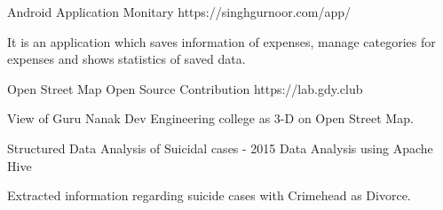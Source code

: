 \begin{cventries}

\cventry
{Android Application}%
{Monitary} 
{https://singhgurnoor.com/app/ } %
{ } %
{ \begin{cvitems}
\item {It is an application which saves information of expenses, manage categories for expenses and shows statistics of saved data.}\end{cvitems}
}

\cventry
{Open Street Map} %
{Open Source Contribution} %
{https://lab.gdy.club} %
{ } %
{ \begin{cvitems}
\item {View of Guru Nanak Dev Engineering college as $3$-D on Open Street Map.}\end{cvitems}
}
 
\cventry
{Structured Data Analysis of Suicidal cases - 2015} %
{Data Analysis using Apache Hive } %
{ } %
{ } %
{\begin{cvitems}
\item {Extracted information regarding suicide cases with Crimehead as
Divorce.}\end{cvitems}}
 
\end{cventries}